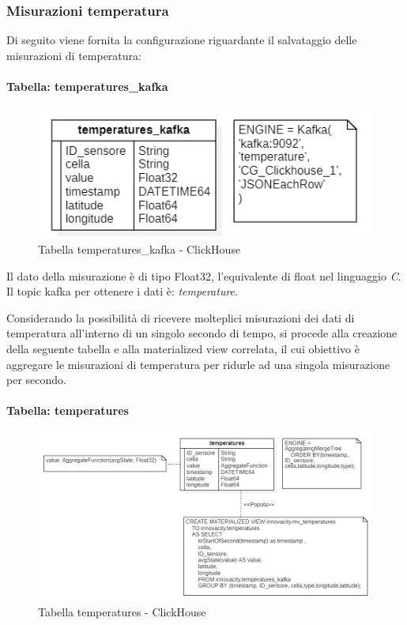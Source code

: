     
\subsubsection{Misurazioni temperatura} \label{sec:tab_temperatures}
Di seguito viene fornita la configurazione riguardante il salvataggio delle misurazioni di temperatura:
\paragraph{Tabella: temperatures\_kafka}
\begin{figure}[H]
    \centering
    \includegraphics[width=1\textwidth]{../Images/SpecificaTecnica/temperatures_kafka.PNG}
    \caption{Tabella temperatures\_kafka - ClickHouse}
    \label{fig:temperaturesKafka}
  \end{figure}

Il dato della misurazione è di tipo Float32, l'equivalente di float nel linguaggio \textit{C}.
Il topic kafka per ottenere i dati è: \textit{temperature}.

Considerando la possibilità di ricevere molteplici misurazioni dei dati di temperatura all'interno di un singolo secondo di tempo, si procede alla creazione della seguente tabella e alla materialized view correlata, il cui obiettivo è aggregare le misurazioni di temperatura per ridurle ad una singola misurazione per secondo.

\paragraph{Tabella: temperatures}
\begin{figure}[H]
    \centering
    \includegraphics[width=1\textwidth]{../Images/SpecificaTecnica/temperatures.PNG}
    \caption{Tabella temperatures - ClickHouse}
    \label{fig:temperatures}
  \end{figure}

